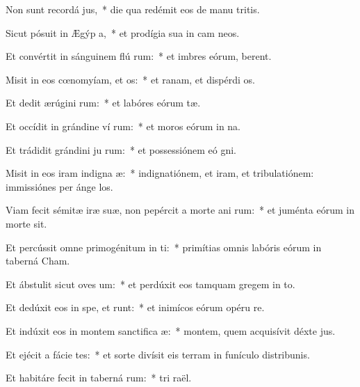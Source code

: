 \item Non sunt recordá  jus,~* die qua redémit eos de manu tritis.
\item Sicut pósuit in Ægýp  a,~* et prodígia sua in cam neos.
\item Et convértit in sánguinem flú rum:~* et imbres eórum,  berent.
\item Misit in eos cœnomyíam, et  os:~* et ranam, et dispérdi os.
\item Et dedit ærúgini  rum:~* et labóres eórum tæ.
\item Et occídit in grándine ví rum:~* et moros eórum in na.
\item Et trádidit grándini ju rum:~* et possessiónem eó gni.
\item Misit in eos iram indigna æ:~* indignatiónem, et iram, et tribulatiónem: immissiónes per ánge los.
\item Viam fecit sémitæ iræ suæ, non pepércit a morte ani rum:~* et juménta eórum in morte sit.
\item Et percússit omne primogénitum in  ti:~* primítias omnis labóris eórum in taberná Cham.
\item Et ábstulit sicut oves  um:~* et perdúxit eos tamquam gregem in to.
\item Et dedúxit eos in spe, et  runt:~* et inimícos eórum opéru re.
\item Et indúxit eos in montem sanctifica æ:~* montem, quem acquisívit déxte jus.
\item Et ejécit a fácie  tes:~* et sorte divísit eis terram in funículo distribunis.
\item Et habitáre fecit in taberná rum:~* tri raël.
